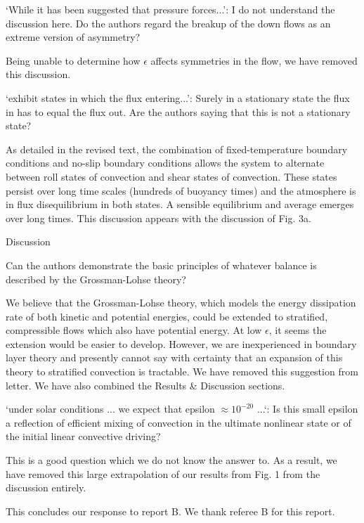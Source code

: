 \documentclass[aps, 11pt, singlecolumn]{revtex4-1} %
\begin{document}
\begin{singlespace}
\begin{myquotation}
`While it has been suggested that pressure forces...': I do not
understand the discussion here. Do the authors regard the breakup of
the down flows as an extreme version of asymmetry?
\end{myquotation}
Being unable to determine how $\epsilon$ affects symmetries in the
flow, we have removed this discussion.

\begin{myquotation}
`exhibit states in which the flux entering...': Surely in a
stationary state the flux in has to equal the flux out. Are the
authors saying that this is not a stationary state?
\end{myquotation}
As detailed in the revised text, the combination of fixed-temperature
boundary conditions and no-slip boundary conditions allows the system to alternate between
roll states of convection and shear states of convection.  These states persist over long
time scales (hundreds of buoyancy times) and the atmosphere is in flux disequilibrium in both states.
A sensible equilibrium and average emerges over long times.  This discussion appears with
the discussion of Fig. 3a.

\begin{myquotation}
Discussion

Can the authors demonstrate the basic principles of whatever balance
is described by the Grossman-Lohse theory?
\end{myquotation}
We believe that the Grossman-Lohse theory, which models the energy dissipation rate of both
kinetic and potential energies, could be extended to stratified, compressible flows which also
have potential energy.  At low $\epsilon$, it seems the extension would be easier to
develop. However, we are inexperienced in boundary layer theory and presently 
cannot say with certainty that an expansion of this theory to stratified convection is tractable. 
We have removed this suggestion from letter.  We have also combined the Results \& Discussion
sections.


\begin{myquotation}
`under solar conditions ... we expect that epsilon  $\approx 10^{-20}$
...`: Is this small epsilon a reflection of efficient mixing of
convection in the ultimate nonlinear state or of the initial linear
convective driving?
\end{myquotation}
This is a good question which we do not know the answer to.  As a result, we have
removed this large extrapolation of our results from Fig. 1 from the discussion
entirely.

This concludes our response to report B.  We thank referee B for this report.

$\,$
\newline
\noindent


\end{singlespace}





\end{document}
